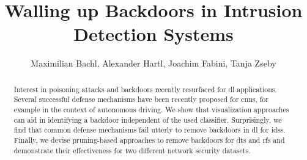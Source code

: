 \documentclass[9pt,sigconf,letterpaper,dvipsnames\ifx\removeHeaders\tempYes ,nonacm\fi]{acmart}
\begin{document}
\title{Walling up Backdoors in Intrusion Detection Systems}



\begin{abstract}
Interest in poisoning attacks and backdoors recently resurfaced for \gls{dl} applications. Several successful defense mechanisms have been recently proposed for \glspl{cnn}, for example in the context of autonomous driving. We show that visualization approaches can aid in identifying a backdoor independent of the used classifier. Surprisingly, we find that common defense mechanisms fail utterly to remove backdoors in \gls{dl} for \glspl{ids}. Finally, we devise pruning-based approaches to remove backdoors for \glspl{dt} and \glspl{rf} and demonstrate their effectiveness for two different %
network security datasets.
\end{abstract}

\author{Maximilian Bachl, Alexander Hartl, Joachim Fabini, Tanja Zseby}


\end{document}
